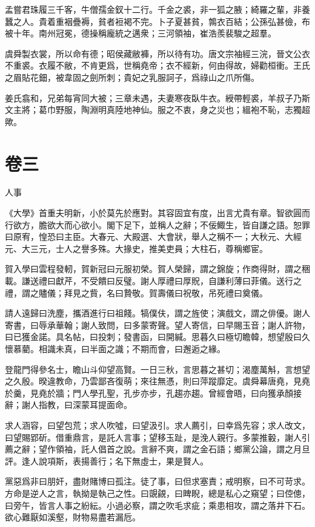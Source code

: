 \documentclass[12pt,a4paper]{ctexbook}
\begin{document}
孟嘗君珠履三千客，牛僧孺金釵十二行。千金之裘，非一狐之腋；綺羅之輩，非養蠶之人。貴着重裀疊褥，貧者裋褐不完。卜子夏甚貧，鶉衣百結；公孫弘甚儉，布被十年。南州冠冕，德操稱龐統之邁衆；三河領袖，崔浩羨裴駿之超羣。\par
虞舜製衣裳，所以命有德；昭侯藏敝褲，所以待有功。唐文宗袖經三浣，晉文公衣不重裘。衣履不敝，不肯更爲，世稱堯帝；衣不經新，何由得故，婦勸桓衝。王氏之眉貼花鈿，被韋固之劍所刺；貴妃之乳服訶子，爲祿山之爪所傷。\par
姜氏翕和，兄弟每宵同大被；三章未遇，夫妻寒夜臥牛衣。綬帶輕裘，羊叔子乃斯文主將；葛巾野服，陶淵明真陸地神仙。服之不衷，身之災也；縕袍不恥，志獨超歟。\par

\section{卷三}
人事\par
《大學》首重夫明新，小於莫先於應對。其容固宜有度，出言尤貴有章。智欲圓而行欲方，膽欲大而心欲小。閣下足下，並稱人之辭；不佞鯫生，皆自謙之語。恕罪曰原宥，惶恐曰主臣。大春元、大殿選、大會狀，舉人之稱不一；大秋元、大經元、大三元，士人之譽多殊。大掾史，推美吏員；大柱石，尊稱鄉宦。\par
賀入學曰雲程發軔，賀新冠曰元服初榮。賀人榮歸，謂之錦旋；作商得財，謂之稇載。謙送禮曰獻芹，不受饋曰反璧。謝人厚禮曰厚貺，自謙利薄曰菲儀。送行之禮，謂之贐儀；拜見之貲，名曰贄敬。賀壽儀曰祝敬，吊死禮曰奠儀。\par
請人遠歸曰洗塵，攜酒進行曰祖餞。犒僕伕，謂之旌使；演戲文，謂之俳優。謝人寄書，曰辱承華翰；謝人致問，曰多蒙寄聲。望人寄信，曰早賜玉音；謝人許物，曰已獲金諾。具名帖，曰投刺；發書函，曰開緘。思暮久曰極切瞻韓，想望殷曰久懷慕藺。相識未真，曰半面之識；不期而會，曰邂逅之緣。\par
登龍門得參名士，瞻山斗仰望高賢。一日三秋，言思暮之甚切；渴塵萬斛，言想望之久殷。暌違教命，乃雲鄙吝復萌；來往無憑，則曰萍蹤靡定。虞舜幕唐堯，見堯於羹，見堯於牆；門人學孔聖，孔步亦步，孔趨亦趨。曾經會晤，曰向獲承顏接辭；謝人指教，曰深蒙耳提面命。\par
求人涵容，曰望包荒；求人吹噓，曰望汲引。求人薦引，曰幸爲先容；求人改文，曰望賜郢斫。借重鼎言，是託人言事；望移玉趾，是浼人親行。多蒙推轂，謝人引薦之辭；望作領袖，託人倡首之說。言辭不爽，謂之金石語；鄉黨公論，謂之月旦評。逢人說項斯，表揚善行；名下無虛士，果是賢人。\par
黨惡爲非曰朋奸，盡財賭博曰孤注。徒了事，曰但求塞責；戒明察，曰不可苛求。方命是逆人之言，執拗是執己之性。曰覬覦，曰睥睨，總是私心之窺望；曰倥傯，曰旁午，皆言人事之紛紜。小過必察，謂之吹毛求疵；乘患相攻，謂之落井下石。欲心難厭如溪壑，財物易盡若漏卮。\par
\end{document}
